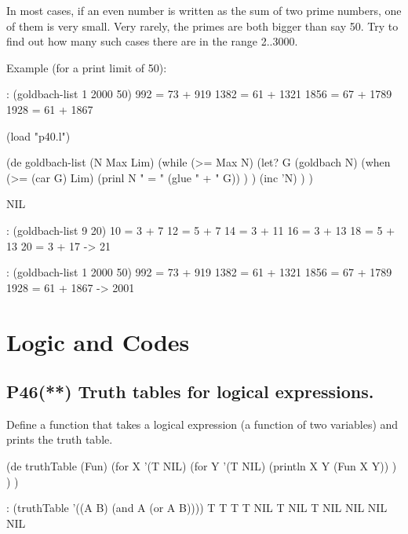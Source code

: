 In most cases, if an even number is written as the sum of two prime
numbers, one of them is very small. Very rarely, the primes are both
bigger than say 50. Try to find out how many such cases there are in the
range 2..3000.

 Example (for a print limit of 50):

\begin{wideverbatim}
   : (goldbach-list 1 2000 50)
   992 = 73 + 919
   1382 = 61 + 1321
   1856 = 67 + 1789
   1928 = 61 + 1867
\end{wideverbatim}

\begin{wideverbatim}

(load "p40.l")

(de goldbach-list (N Max Lim)
   (while (>= Max N)
      (let? G (goldbach N)
         (when (>= (car G) Lim)
            (prinl N " = " (glue " + " G)) ) )
      (inc 'N) ) )

NIL

: (goldbach-list 9 20)
10 = 3 + 7
12 = 5 + 7
14 = 3 + 11
16 = 3 + 13
18 = 5 + 13
20 = 3 + 17
-> 21

: (goldbach-list 1 2000 50)
992 = 73 + 919
1382 = 61 + 1321
1856 = 67 + 1789
1928 = 61 + 1867
-> 2001

\end{wideverbatim}

\pagebreak{}
\section*{Logic and Codes}

\subsection*{{P46}(**) Truth tables for logical
expressions.}
\label{sec:99-problems-P46} 

Define a function that takes a logical expression (a function of two
variables) and prints the truth table.

\begin{wideverbatim}

(de truthTable (Fun)
   (for X '(T NIL)
      (for Y '(T NIL)
         (println X Y (Fun X Y)) ) ) )

\end{wideverbatim}

\begin{wideverbatim}
   : (truthTable '((A B) (and A (or A B))))
   T T T
   T NIL T
   NIL T NIL
   NIL NIL NIL
\end{wideverbatim}


